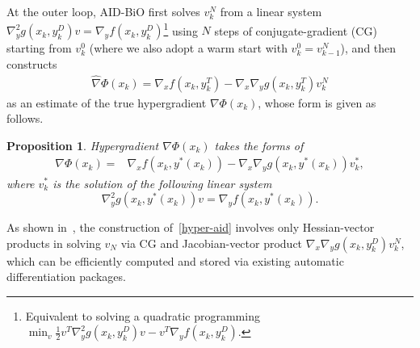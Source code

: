 \documentclass{osudissert96}
\newtheorem{proposition}{Proposition}
\begin{document}
At the outer loop,  AID-BiO first solves $v_k^N$ from a linear system $\nabla_y^2 g(x_k,y_k^D) v = 
\nabla_y f(x_k,y^D_k)$\footnote{Equivalent to solving a quadratic programming $\min_v\frac{1}{2} v^T\nabla_y^2g(x_k,y_k^D) v-v^T\nabla_y f(x_k,y^D_k).$ } using $N$ steps of conjugate-gradient (CG) starting from $v_k^0$ (where we also adopt a warm start with $v_k^0=v_{k-1}^N$), and then constructs \begin{align}\label{hyper-aid}
\widehat\nabla \Phi(x_k)= \nabla_x f(x_k,y_k^T) -\nabla_x \nabla_y g(x_k,y_k^T)v_k^N
\end{align}
as an estimate of the true hypergradient $\nabla \Phi(x_k)$, whose form is given as follows.  
\begin{proposition}\label{prop:grad}
Hypergradient $\nabla \Phi(x_k)$ takes the forms of 
\begin{align}\label{trueG}
\nabla \Phi(x_k) =&  \nabla_x f(x_k,y^*(x_k)) -\nabla_x \nabla_y g(x_k,y^*(x_k)) v_k^*, %
\end{align}
where $v_k^*$ is the solution of the following linear system $$ \nabla_y^2 g(x_k,y^*(x_k))v=
\nabla_y f(x_k,y^*(x_k)).$$
\end{proposition}
As shown in~\cite{domke2012generic,grazzi2020iteration}, the construction of~\cref{hyper-aid} involves only Hessian-vector products in solving $v_N$ via CG and Jacobian-vector product $\nabla_x \nabla_y g(x_k,y_k^D)v_k^N$, which can be efficiently computed and stored via existing automatic differentiation packages.  
\end{document}
